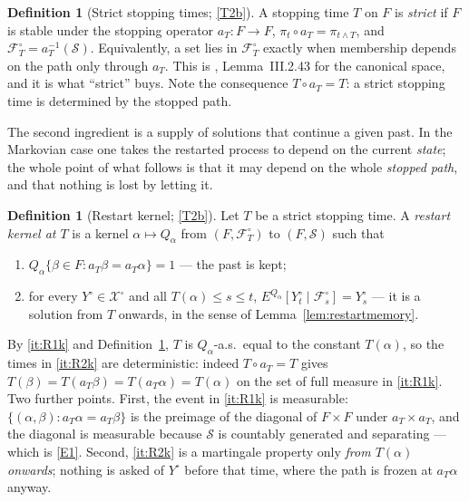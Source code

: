 \documentclass[11pt,a4paper]{article}
\theoremstyle{plain}
\theoremstyle{definition}
\newtheorem{definition}[theorem]{Definition}
\theoremstyle{remark}
\newcommand{\Filt}{\mathcal{F}}
\newcommand{\XX}{\mathcal{X}}                  %
\newcommand{\JS}{\cite{JS03}}
\begin{document}
\begin{definition}[Strict stopping times; \eqref{T2b}]
  \label{def:pasting}
  A stopping time $T$ on $F$ is \emph{strict} if $F$ is stable under the stopping
  operator $a_T : F \to F$, $\pi_t \circ a_T = \pi_{t \wedge T}$, and
  $\Filt^\circ_T = a_T^{-1}(\mathcal{S})$.  Equivalently, a set lies in
  $\Filt^\circ_T$ exactly when membership depends on the path only through $a_T$.
  This is \JS, Lemma~III.2.43 for the canonical space, and it is what ``strict''
  buys.  Note the consequence $T \circ a_T = T$: a strict stopping time is
  determined by the stopped path.
\end{definition}

The second ingredient is a supply of solutions that continue a given past.  In
the Markovian case one takes the restarted process to depend on the current
\emph{state}; the whole point of what follows is that it may depend on the whole
\emph{stopped path}, and that nothing is lost by letting it.

\begin{definition}[Restart kernel; \eqref{T2b}]
  \label{def:restartkernel}
  Let $T$ be a strict stopping time.  A \emph{restart kernel at $T$} is a kernel
  $\alpha \mapsto Q_\alpha$ from $(F,\Filt^\circ_T)$ to $(F,\mathcal{S})$ such that
  \begin{enumerate}[label=(R\arabic*)]
  \item \label{it:R1k}
    $Q_\alpha\{\beta \in F : a_T\beta = a_T\alpha\} = 1$ --- the past is kept;
  \item \label{it:R2k}
    for every $Y^\circ \in \XX^\circ$ and all $T(\alpha) \leq s \leq t$,
    $E^{Q_\alpha}[Y^\circ_t \mid \Filt^\circ_s] = Y^\circ_s$ --- it is a solution
    from $T$ onwards, in the sense of Lemma~\ref{lem:restartmemory}.
  \end{enumerate}
  By \ref{it:R1k} and Definition~\ref{def:pasting}, $T$ is $Q_\alpha$-a.s.\ equal
  to the constant $T(\alpha)$, so the times in \ref{it:R2k} are deterministic:
  indeed $T \circ a_T = T$ gives $T(\beta) = T(a_T\beta) = T(a_T\alpha) = T(\alpha)$
  on the set of full measure in \ref{it:R1k}.  Two further points.  First, the
  event in \ref{it:R1k} is measurable: $\{(\alpha,\beta) : a_T\alpha = a_T\beta\}$
  is the preimage of the diagonal of $F \times F$ under $a_T \times a_T$, and the
  diagonal is measurable because $\mathcal{S}$ is countably generated and
  separating --- which is \eqref{E1}.  Second, \ref{it:R2k} is a martingale property
  only \emph{from $T(\alpha)$ onwards}; nothing is asked of $Y^\circ$ before that
  time, where the path is frozen at $a_T\alpha$ anyway.
\end{definition}
\end{document}
